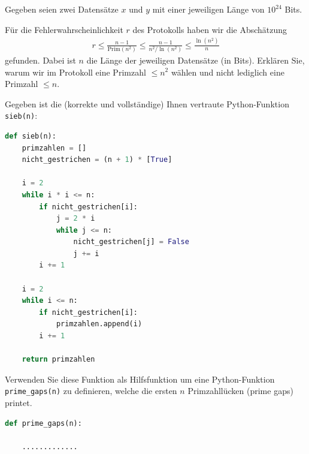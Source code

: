 \begin{questions}
\question Gegeben seien zwei Datensätze $x$ und $y$ mit einer jeweiligen Länge von $10^{24}$ Bits. 
\droptotalpoints

\question[2]
Für die Fehlerwahrscheinlichkeit $r$ des Protokolls haben wir die Abschätzung
\begin{align*}
    r \leq \frac{n-1}{\text{Prim}(n^2)}\leq \frac{n-1}{n^2/\ln(n^2)}\leq\frac{\ln(n^2)}{n}
\end{align*}
gefunden. Dabei ist $n$ die Länge der jeweiligen Datensätze (in Bits). Erklären Sie, warum wir im Protokoll eine Primzahl $\leq n^2$ wählen und nicht lediglich eine Primzahl $\leq n$.

\clearpage
\question[2]
Gegeben ist die (korrekte und vollständige) Ihnen vertraute Python-Funktion \lstinline|sieb(n)|:
\begin{lstlisting}[language=Python,caption=Sieb,numbers=none]
def sieb(n):
    primzahlen = []
    nicht_gestrichen = (n + 1) * [True]

    i = 2
    while i * i <= n:
        if nicht_gestrichen[i]:
            j = 2 * i
            while j <= n:
                nicht_gestrichen[j] = False
                j += i
        i += 1

    i = 2
    while i <= n:
        if nicht_gestrichen[i]:
            primzahlen.append(i)
        i += 1

    return primzahlen
\end{lstlisting}
Verwenden Sie diese Funktion als Hilfsfunktion um eine Python-Funktion \lstinline|prime_gaps(n)| zu definieren, welche die ersten $n$ Primzahllücken (prime gaps) printet.
\begin{lstlisting}[language=Python,caption=prime gaps (noch zu vervollständigen),numbers=none]
def prime_gaps(n):

    .............


\end{lstlisting}
\end{questions}
